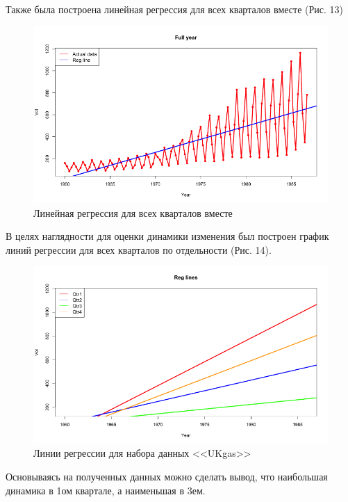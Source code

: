 \documentclass[]{article}
\numberwithin{equation}{section}
\begin{document}
    \vspace{-0.4cm}
    Также была построена линейная регрессия для всех кварталов вместе (Рис. 13)
    \vspace{-0.4cm}
    \begin{figure}[H]
        \centering
        \includegraphics[width = 0.8\linewidth]{data/UKgas_reg_line_full.png}
        \vspace{-0.5cm}
        \caption{Линейная регрессия для всех кварталов вместе}
    \end{figure}

    В целях наглядности для оценки динамики изменения был построен график линий регрессии для всех кварталов по отдельности (Рис. 14).

    \begin{figure}[H]
        \centering
        \includegraphics[width = 0.9\linewidth]{data/UKgas_reg_lines.png}
        \caption{Линии регрессии для набора данных <<UKgas>>}
    \end{figure}

    Основываясь на полученных данных можно сделать вывод, что наибольшая динамика в 1ом квартале, а наименьшая в 3ем.
\end{document}
